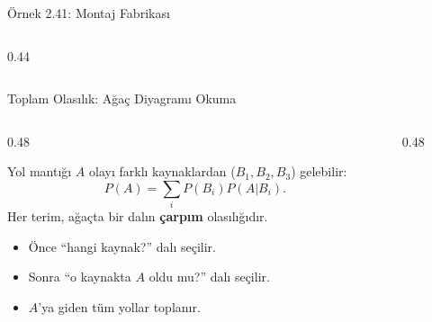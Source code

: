 \documentclass[light]{lutbeamer}
\begin{document}
\begin{frame}{Örnek 2.41: Montaj Fabrikası}
\begin{columns}[T]
\begin{column}{0.44\textwidth}
        \end{column}
    \end{columns}
\end{frame}




\begin{frame}{Toplam Olasılık: Ağaç Diyagramı Okuma}
    \begin{columns}[T]
        \begin{column}{0.48\textwidth}
            \begin{block}{Yol mantığı}
                $A$ olayı farklı kaynaklardan ($B_1,B_2,B_3$) gelebilir:
                \[
                P(A)=\sum_i P(B_i)P(A|B_i).
                \]
                Her terim, ağaçta bir dalın \textbf{çarpım} olasılığıdır.
            \end{block}
            \begin{itemize}
                \item Önce ``hangi kaynak?'' dalı seçilir.
                \item Sonra ``o kaynakta $A$ oldu mu?'' dalı seçilir.
                \item $A$'ya giden tüm yollar toplanır.
            \end{itemize}
        \end{column}
        \begin{column}{0.48\textwidth}
            \centering
\end{column}
\end{columns}
\end{frame}
\end{document}
